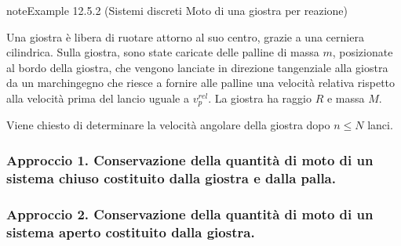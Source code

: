 \documentclass[letterpaper,10pt,italian]{jupyterBook}
\begin{document}
\begin{sphinxadmonition}{note}{Example 12.5.2 (Sistemi discreti \sphinxhyphen{} Moto di una giostra per reazione)}



\sphinxAtStartPar
Una giostra è libera di ruotare attorno al suo centro, grazie a una cerniera cilindrica. Sulla giostra, sono state caricate delle palline di massa \(m\), posizionate al bordo della giostra, che vengono lanciate in direzione tangenziale alla giostra da un marchingegno che riesce a fornire alle palline una velocità relativa rispetto alla velocità prima del lancio uguale a \(v_p^{rel}\). La giostra ha raggio \(R\) e massa \(M\).



\sphinxAtStartPar
Viene chiesto di determinare la velocità angolare della giostra dopo \(n \le N\) lanci.  

\sphinxAtStartPar
{}  
\subsubsection*{Approccio 1. Conservazione della quantità di moto di un sistema chiuso costituito dalla giostra e dalla palla.}
\subsubsection*{Approccio 2. Conservazione della quantità di moto di un sistema aperto costituito dalla giostra.}


\end{sphinxadmonition}
\end{document}
